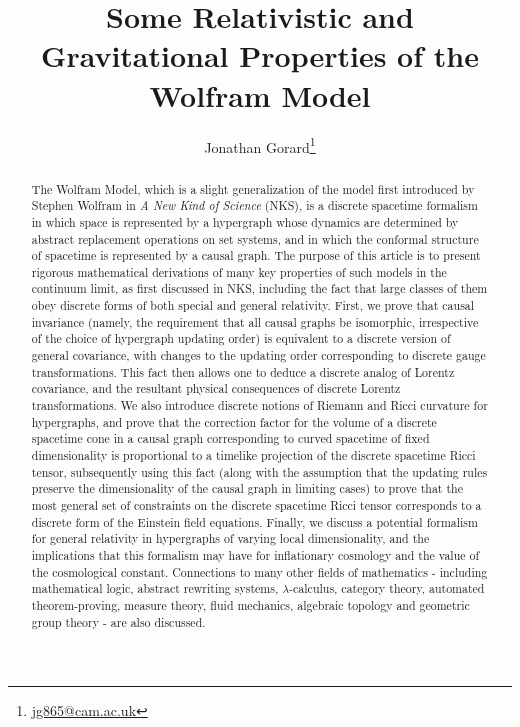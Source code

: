 \documentclass{article}
\begin{document}
\title{{\LARGE Some Relativistic and Gravitational Properties of the Wolfram Model}}
\author{{\Large Jonathan Gorard\footnote{\url{jg865@cam.ac.uk}}}}

\maketitle

\newtheorem{definition}{Definition}

\begin{abstract}
The Wolfram Model, which is a slight generalization of the model first introduced by Stephen Wolfram in \textit{A New Kind of Science} (NKS), is a discrete spacetime formalism in which space is represented by a hypergraph whose dynamics are determined by abstract replacement operations on set systems, and in which the conformal structure of spacetime is represented by a causal graph. The purpose of this article is to present rigorous mathematical derivations of many key properties of such models in the continuum limit, as first discussed in NKS, including the fact that large classes of them obey discrete forms of both special and general relativity. First, we prove that causal invariance (namely, the requirement that all causal graphs be isomorphic, irrespective of the choice of hypergraph updating order) is equivalent to a discrete version of general covariance, with changes to the updating order corresponding to discrete gauge transformations. This fact then allows one to deduce a discrete analog of Lorentz covariance, and the resultant physical consequences of discrete Lorentz transformations. We also introduce discrete notions of Riemann and Ricci curvature for hypergraphs, and prove that the correction factor for the volume of a discrete spacetime cone in a causal graph corresponding to curved spacetime of fixed dimensionality is proportional to a timelike projection of the discrete spacetime Ricci tensor, subsequently using this fact (along with the assumption that the updating rules preserve the dimensionality of the causal graph in limiting cases) to prove that the most general set of constraints on the discrete spacetime Ricci tensor corresponds to a discrete form of the Einstein field equations. Finally, we discuss a potential formalism for general relativity in hypergraphs of varying local dimensionality, and the implications that this formalism may have for inflationary cosmology and the value of the cosmological constant. Connections to many other fields of mathematics - including mathematical logic, abstract rewriting systems, ${\lambda}$-calculus, category theory, automated theorem-proving, measure theory, fluid mechanics, algebraic topology and geometric group theory - are also discussed.
\end{abstract}
\end{document}
